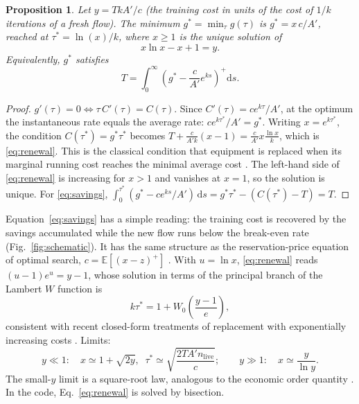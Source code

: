 \documentclass[11pt,a4paper]{article}
\newtheorem{proposition}{Proposition}
\newcommand{\E}{\mathbb{E}}
\newcommand{\nlive}{n_{\mathrm{live}}}
\begin{document}
\begin{proposition}
Let $y = TkA'/c$ (the training cost in units of the cost of $1/k$ iterations
of a fresh flow). The minimum $g^*=\min_\tau g(\tau)$ is $g^* = x\,c/A'$,
reached at $\tau^* = \ln(x)/k$, where $x\geq1$ is the unique solution of
\begin{equation}
  x\ln x - x + 1 = y. \label{eq:renewal}
\end{equation}
Equivalently, $g^*$ satisfies
\begin{equation}
  T = \int_0^\infty \left(g^* - \frac{c}{A'}e^{ks}\right)^+ \mathrm{d}s .
  \label{eq:savings}
\end{equation}
\end{proposition}
\begin{proof}
$g'(\tau)=0 \iff \tau\,C'(\tau) = C(\tau)$. Since $C'(\tau) = c e^{k\tau}/A'$,
at the optimum the instantaneous rate equals the average rate:
$c e^{k\tau^*}/A' = g^*$. Writing $x=e^{k\tau^*}$, the condition
$C(\tau^*) = g^*\tau^*$ becomes
$T + \frac{c}{A'k}(x-1) = \frac{c}{A'}x\frac{\ln x}{k}$, which is
\eqref{eq:renewal}. This is the classical condition that equipment is
replaced when its marginal running cost reaches the minimal average cost
\citep{Taylor1923,Hotelling1925}. The left-hand side of \eqref{eq:renewal} is increasing
for $x>1$ and vanishes at $x=1$, so the solution is unique. For
\eqref{eq:savings}, $\int_0^{\tau^*}(g^*-c e^{ks}/A')\,\mathrm{d}s
= g^*\tau^* - (C(\tau^*)-T) = T$.
\end{proof}

Equation~\eqref{eq:savings} has a simple reading: the training cost is
recovered by the savings accumulated while the new flow runs below the
break-even rate (Fig.~\ref{fig:schematic}). It has the same structure as
the reservation-price equation of optimal search, $c = \E[(x-z)^+]$
\citep{Weitzman1979}. With $u=\ln x$, \eqref{eq:renewal} reads
$(u-1)e^u = y-1$, whose solution in terms of the principal branch of the
Lambert $W$ function is
\begin{equation}
  k\tau^* = 1 + W_0\!\left(\frac{y-1}{e}\right),
\end{equation}
consistent with recent closed-form treatments of replacement with
exponentially increasing costs \citep{TiradoSerrato2025}. Limits:
\begin{equation}
  y\ll1:\quad x\simeq 1+\sqrt{2y},\;\;
  \tau^*\simeq\sqrt{\frac{2T A'\nlive}{c}};
  \qquad
  y\gg1:\quad x\simeq \frac{y}{\ln y}.
\end{equation}
The small-$y$ limit is a square-root law, analogous to the economic order
quantity \citep{Harris1913}. In the code, Eq.~\eqref{eq:renewal} is solved
by bisection.
\end{document}
